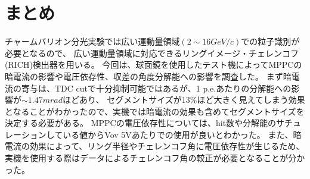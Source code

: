 \documentclass[uplatex, titlepage, dvipdfmx, 12pt, a4paper]{jsreport}
\begin{document}
\chapter{まとめ}
    チャームバリオン分光実験では広い運動量領域$\left(2\sim16\si{GeV/c}\right)$での粒子識別が必要となるので、
    広い運動量領域に対応できるリングイメージ・チェレンコフ(RICH)検出器を用いる。
    今回は、球面鏡を使用したテスト機によってMPPCの暗電流の影響や電圧依存性、収差の角度分解能への影響を調査した。
    まず暗電流の寄与は、TDC cutで十分抑制可能ではあるが、1 p.e.あたりの分解能への影響が$\sim1.47\si{mrad}$ほどあり、
    セグメントサイズが13\%ほど大きく見えてしまう効果となることがわかったので、実機では暗電流の効果も含めてセグメントサイズを決定する必要がある。
    MPPCの電圧依存性については、hit数や分解能のサチュレーションしている値からVov 5Vあたりでの使用が良いとわかった。
    また、暗電流の効果によって、リング半径やチェレンコフ角に電圧依存性が生じるため、実機を使用する際はデータによるチェレンコフ角の較正が必要となることが分かった。
\end{document}
